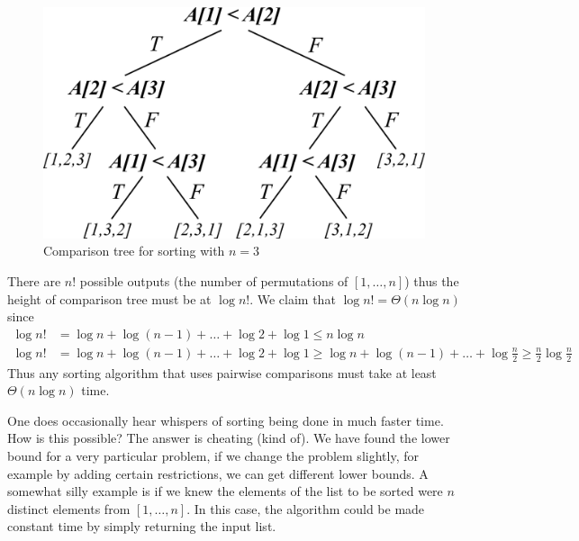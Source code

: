 \begin{figure}[h]
    \centering
    \includegraphics[scale=0.5]{Images/sorting_compar_tree.png}
    \caption{Comparison tree for sorting with $n = 3$}
    \label{fig:sorting-compar-tree}
\end{figure}

There are $n!$ possible outputs (the number of permutations of $[1, \dots, n]$) thus the height of comparison tree must be at $\log n!$. We claim that $\log n! = \Theta(n \log n)$ since
\begin{align*}
    \log n! &= \log n + \log(n - 1) + \dots + \log 2 + \log 1 \leq n \log n\\
    \log n! &= \log n + \log(n - 1) + \dots + \log 2 + \log 1 \geq \log n + \log(n - 1) + \dots + \log \frac{n}{2} \geq \frac{n}{2} \log \frac{n}{2}
\end{align*}
Thus any sorting algorithm that uses pairwise comparisons must take at least $\Theta(n \log n)$ time.

One does occasionally hear whispers of sorting being done in much faster time. How is this possible? The answer is cheating (kind of). We have found the lower bound for a very particular problem, if we change the problem slightly, for example by adding certain restrictions, we can get different lower bounds. A somewhat silly example is if we knew the elements of the list to be sorted were $n$ distinct elements from $[1, \dots, n]$. In this case, the algorithm could be made constant time by simply returning the input list. 
